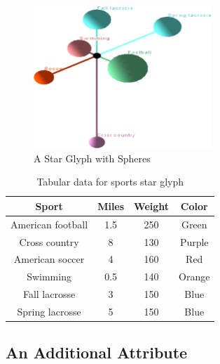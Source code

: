 \documentclass[]{article}
\begin{document}
\begin{figure}[htb]
\begin{center}
\includegraphics[width=0.6\textwidth, keepaspectratio=true]{images/starsphere}
\end{center}
\caption{A Star Glyph with Spheres}
\label {fig:spheres}
\end{figure}

\begin{table}
\begin{center}

    \begin{tabular}{ | c | c | c | c |} \hline
    \textbf{Sport}      & \textbf{Miles}    & \textbf{Weight}   & \textbf{Color}    \\ \hline
    American football   & 1.5               & 250               & Green             \\ \hline
    Cross country       & 8                 & 130               & Purple            \\ \hline
    American soccer     & 4                 & 160               & Red               \\ \hline
    Swimming            & 0.5               & 140               & Orange            \\ \hline
    Fall lacrosse       & 3                 & 150               & Blue              \\ \hline
    Spring lacrosse     & 5                 & 150               & Blue              \\ \hline
    \end{tabular}
    
\end{center}
\caption{Tabular data for sports star glyph}
\label {table:sports}
\end{table}

\subsection{An Additional Attribute}
\label{ss:additional_attribute}
\end{document}

